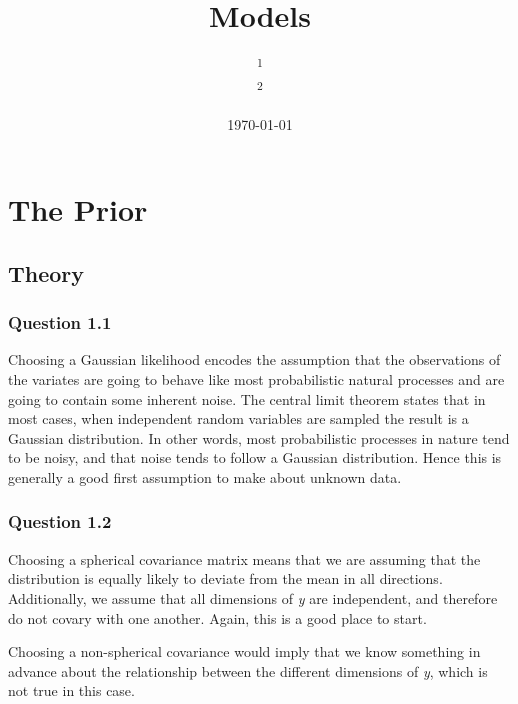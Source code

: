 \documentclass[10pt, a4paper, twocolumn]{article} %
\title{Models} %
\author{
	\authorstyle{Justin Salmon\textsuperscript{1} and George Lancaster\textsuperscript{2}} %
	\newline\newline %
	\textsuperscript{1}\institution{wr18313}\\ %
	\textsuperscript{2}\institution{qv18258} %
}
\date{\today} %
\begin{document}
\maketitle %

\thispagestyle{firstpage} %




\section{The Prior}

\subsection{Theory}

\subsubsection*{Question 1.1}
Choosing a Gaussian likelihood encodes the assumption that the observations of the variates are going to behave like most probabilistic natural processes and are going to contain some inherent noise. The central limit theorem states that in most cases, when independent random variables are sampled the result is a Gaussian distribution. In other words, most probabilistic processes in nature tend to be noisy, and that noise tends to follow a Gaussian distribution. Hence this is generally a good first assumption to make about unknown data.
\subsubsection*{Question 1.2}
Choosing a spherical covariance matrix means that we are assuming that the distribution is equally likely to deviate from the mean in all directions. Additionally, we assume that all dimensions of \emph{y} are independent, and therefore do not covary with one another. Again, this is a good place to start. \par
Choosing a non-spherical covariance would imply that we know something in advance about the relationship between the different dimensions of \emph{y}, which is not true in this case.
\end{document}
